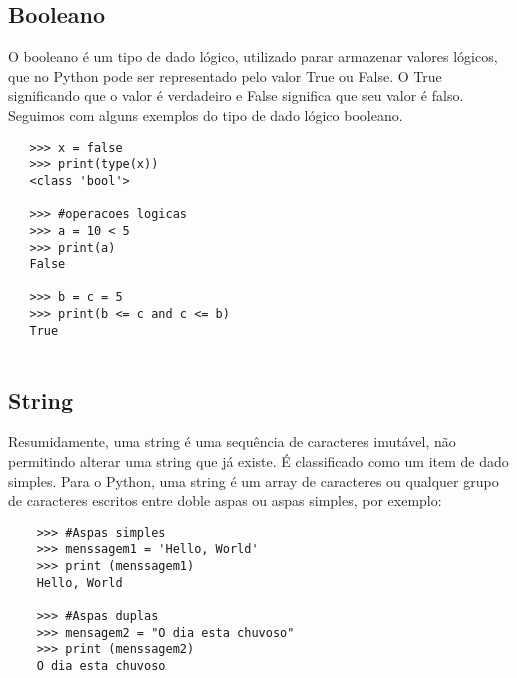 			\subsection{Booleano}
			O booleano é um tipo de dado lógico, utilizado parar armazenar valores lógicos, que no Python pode ser representado pelo valor True ou False. O True significando que o valor é verdadeiro e False significa que seu valor é falso. Seguimos com alguns exemplos do tipo de dado lógico booleano.
			\begin{lstlisting}
   >>> x = false
   >>> print(type(x))
   <class 'bool'>
   
   >>> #operacoes logicas
   >>> a = 10 < 5
   >>> print(a)
   False
   
   >>> b = c = 5
   >>> print(b <= c and c <= b)
   True
   
			\end{lstlisting}
            \subsection{String}
            Resumidamente, uma string é uma sequência de caracteres imutável, não permitindo alterar uma string que já existe. É classificado como um item de dado simples. Para o Python, uma string é um array de caracteres ou qualquer grupo de caracteres escritos entre doble aspas ou aspas simples, por exemplo:
    \begin{lstlisting}
    >>> #Aspas simples
    >>> menssagem1 = 'Hello, World'
    >>> print (menssagem1)  
    Hello, World
    
    >>> #Aspas duplas
    >>> mensagem2 = "O dia esta chuvoso"
    >>> print (menssagem2)
    O dia esta chuvoso
    \end{lstlisting}
			
